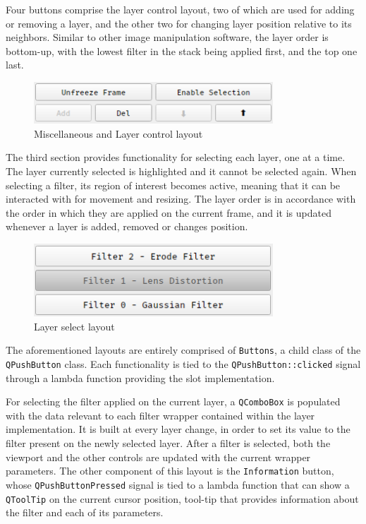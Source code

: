 Four buttons comprise the layer control layout, two of which are used for adding or removing a layer, and  the
other two for changing layer position relative to its neighbors. Similar to other image manipulation software,
the layer order is bottom-up, with the lowest filter in the stack being applied first, and the top one last.

\begin{figure}[H]
	\includegraphics[width=0.8\textwidth, height=0.2\textwidth]{resources/Buttons_Misc.png}
	\caption{Miscellaneous and Layer control layout}
\end{figure}

The third section provides functionality for selecting each layer, one at a time. The layer currently selected
is highlighted and it cannot be selected again. When selecting a filter, its region of interest becomes active,
meaning that it can be interacted with for movement and resizing. The layer order is in accordance with the
order in which they are applied on the current frame, and it is updated whenever a layer is added, removed
or changes position.

\begin{figure}[H]
	\includegraphics[width=0.8\textwidth, height=0.3\textwidth]{resources/Buttons_Layers.png}
	\caption{Layer select layout}
\end{figure}

The aforementioned layouts are entirely comprised of \verb|Buttons|, a child class of the \verb|QPushButton|
class. Each functionality is tied to the \verb|QPushButton::clicked| signal through a lambda function providing
the slot implementation. \cite{qtDoc}

For selecting the filter applied on the current layer, a \verb|QComboBox| is populated with the data relevant
to each filter wrapper contained within the layer implementation. It is built at every layer change, in order
to set its value to the filter present on the newly selected layer. After a filter is selected, both the
viewport and the other controls are updated with the current wrapper parameters. The other component of this
layout is the \verb|Information| button, whose \verb|QPushButtonPressed| signal is tied to a lambda function
that can show a \verb|QToolTip| on the current cursor position, tool-tip that provides information about the
filter and each of its parameters. \cite{qtDoc}

